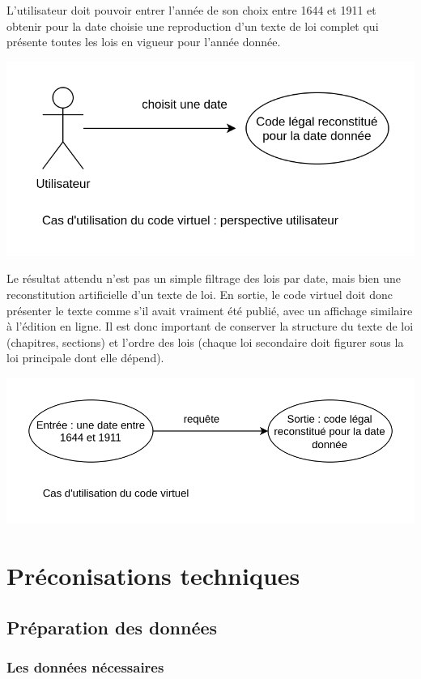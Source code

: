 L’utilisateur doit pouvoir entrer l’année de son choix entre 1644 et 1911 et obtenir pour la date choisie une reproduction d’un texte de loi complet qui présente toutes les lois en vigueur pour l’année donnée.

\noindent \includegraphics[width=\textwidth]{images/annexe9.png}

Le résultat attendu n’est pas un simple filtrage des lois par date, mais bien une reconstitution artificielle d’un texte de loi. En sortie, le code virtuel doit donc présenter le texte comme s’il avait vraiment été publié, avec un affichage similaire à l’édition en ligne. Il est donc important de conserver la structure du texte de loi (chapitres, sections) et l’ordre des lois (chaque loi secondaire doit figurer sous la loi principale dont elle dépend).

\noindent \includegraphics[width=\textwidth]{images/annexe10.png}

\newpage
\section*{Préconisations techniques}
\subsection*{Préparation des données}
\subsubsection{Les données nécessaires}

